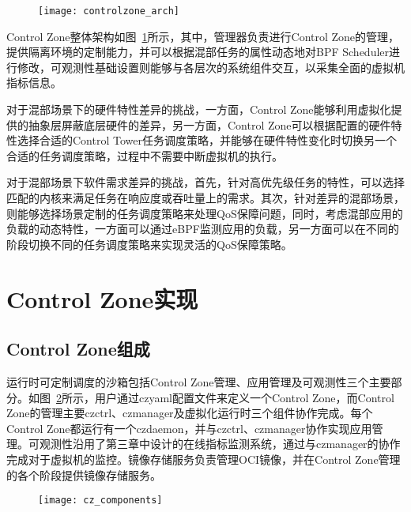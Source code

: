 \begin{figure}[!htbp]
    \centering
    \texttt{[image: controlzone\_arch]}
    \label{fig:controlzone_arch}
\end{figure}
 
Control Zone整体架构如图~\ref{fig:controlzone_arch}所示，其中，管理器负责进行Control Zone的管理，提供隔离环境的定制能力，并可以根据混部任务的属性动态地对BPF Scheduler进行修改，可观测性基础设置则能够与各层次的系统组件交互，以采集全面的虚拟机指标信息。

对于混部场景下的硬件特性差异的挑战，一方面，Control Zone能够利用虚拟化提供的抽象层屏蔽底层硬件的差异，另一方面，Control Zone可以根据配置的硬件特性选择合适的Control Tower任务调度策略，并能够在硬件特性变化时切换另一个合适的任务调度策略，过程中不需要中断虚拟机的执行。

对于混部场景下软件需求差异的挑战，首先，针对高优先级任务的特性，可以选择匹配的内核来满足任务在响应度或吞吐量上的需求。其次，针对差异的混部场景，则能够选择场景定制的任务调度策略来处理QoS保障问题，同时，考虑混部应用的负载的动态特性，一方面可以通过eBPF监测应用的负载，另一方面可以在不同的阶段切换不同的任务调度策略来实现灵活的QoS保障策略。

\section{Control Zone实现}

\subsection{Control Zone组成}


运行时可定制调度的沙箱包括Control Zone管理、应用管理及可观测性三个主要部分。如图~\ref{fig:cz_components}所示，用户通过czyaml配置文件来定义一个Control Zone，而Control Zone的管理主要czctrl、czmanager及虚拟化运行时三个组件协作完成。每个Control Zone都运行有一个czdaemon，并与czctrl、czmanager协作实现应用管理。可观测性沿用了第三章中设计的在线指标监测系统，通过与czmanager的协作完成对于虚拟机的监控。镜像存储服务负责管理OCI镜像，并在Control Zone管理的各个阶段提供镜像存储服务。

\begin{figure}[!htbp]
    \centering
    \texttt{[image: cz\_components]}
    \label{fig:cz_components}
\end{figure}

